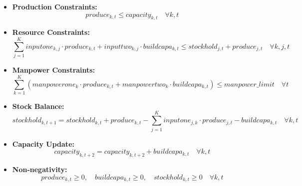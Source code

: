 \documentclass{article}
\begin{document}
\begin{itemize}
    \item \textbf{Production Constraints:}
    \[
    produce_{k, t} \leq capacity_{k, t} \quad \forall k, t
    \]

    \item \textbf{Resource Constraints:}
    \[
    \sum_{j=1}^{K} inputone_{k, j} \cdot produce_{k, t} + inputtwo_{k, j} \cdot buildcapa_{k, t} \leq stockhold_{j, t} + produce_{j, t} \quad \forall k, j, t
    \]

    \item \textbf{Manpower Constraints:}
    \[
    \sum_{k=1}^{K} (manpowerone_{k} \cdot produce_{k, t} + manpowertwo_{k} \cdot buildcapa_{k, t}) \leq manpower\_limit \quad \forall t
    \]

    \item \textbf{Stock Balance:}
    \[
    stockhold_{k, t+1} = stockhold_{k, t} + produce_{k, t} - \sum_{j=1}^{K} inputone_{j, k} \cdot produce_{j, t} - buildcapa_{k, t} \quad \forall k, t
    \]

    \item \textbf{Capacity Update:}
    \[
    capacity_{k, t+2} = capacity_{k, t+2} + buildcapa_{k, t} \quad \forall k, t
    \]

    \item \textbf{Non-negativity:}
    \[
    produce_{k, t} \geq 0, \quad buildcapa_{k, t} \geq 0, \quad stockhold_{k, t} \geq 0 \quad \forall k, t
    \]
\end{itemize}
\end{document}
